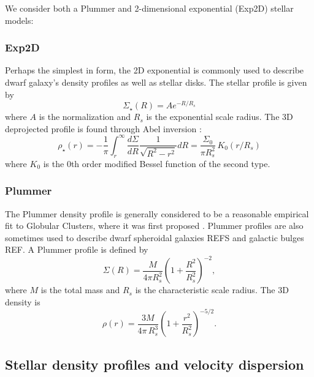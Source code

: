 We consider both a Plummer and 2-dimensional exponential (Exp2D) stellar
models:

\subsubsection{Exp2D}\label{exp2d}

Perhaps the simplest in form, the 2D exponential is commonly used to
describe dwarf galaxy's density profiles as well as stellar disks. The
stellar profile is given by \begin{equation}
\Sigma_\star(R) = A e^{-R / R_s}
\end{equation} where \(A\) is the normalization and \(R_s\) is the
exponential scale radius. The 3D deprojected profile is found through
Abel inversion \citep[e.g.][]{errani+2024}: \begin{equation}
\rho_\star (r) =- \frac{1}{\pi}\int_r^\infty \frac{d\Sigma}{dR} \frac{1}{\sqrt{R^2 - r^2}} dR  = \frac{\Sigma_0}{\pi R_s^2}\,K_0(r/R_s)
\end{equation} where \(K_0\) is the 0th order modified Bessel function
of the second type.

\subsubsection{Plummer}\label{plummer}

The Plummer density profile is generally considered to be a reasonable
empirical fit to Globular Clusters, where it was first proposed
\citep{sadfjk}. Plummer profiles are also sometimes used to describe
dwarf spheroidal galaxies REFS and galactic bulges REF. A Plummer
profile is defined by \begin{equation}
\Sigma(R) = \frac{M}{4\pi R_s^2} \left(1 + \frac{R^2}{R_s^2}\right)^{-2} ,
\end{equation} where \(M\) is the total mass and \(R_s\) is the
characteristic scale radius. The 3D density is \begin{equation}
\rho(r) = \frac{3M}{4\pi\,R_s^3} \left(1 + \frac{r^2}{R_s^2}\right)^{-5/2}.
\end{equation}

\subsection{Stellar density profiles and velocity
dispersion}\label{stellar-density-profiles-and-velocity-dispersion}

